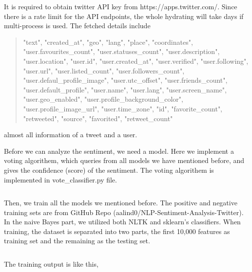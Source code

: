 \documentclass[12pt,a4paper]{article}
\begin{document}
    \inputminted[mathescape, linenos, numbersep=5pt, frame=lines, framesep=2mm, breaklines]{python}{../tweets_fetch.py}

    It is required to obtain twitter API key from https://apps.twitter.com/. Since there is a rate limit for the API endpoints, the whole hydrating will take days if multi-process is used. The fetched details include

    \begin{quotation}
      "text", "created\_at", "geo", "lang", "place", "coordinates", "user.favourites\_count", "user.statuses\_count", "user.description", "user.location", "user.id", "user.created\_at", "user.verified", "user.following", "user.url", "user.listed\_count", "user.followers\_count", "user.defaul_profile\_image", "user.utc\_offset", "user.friends\_count", "user.default\_profile", "user.name", "user.lang", "user.screen\_name", "user.geo\_enabled", "user.profile_background_color", "user.profile\_image\_url", "user.time\_zone", "id", "favorite\_count", "retweeted", "source", "favorited", "retweet\_count"
    \end{quotation}
 
    almost all information of a tweet and a user.

    Before we can analyze the sentiment, we need a model. Here we implement a voting algorithem, which queries from all models we have mentioned before, and gives the confidence (score) of the sentiment. The voting algorithem is implemented in vote_classifier.py file.

    \inputminted[mathescape, linenos, numbersep=5pt, frame=lines, framesep=2mm, breaklines]{python}{../vote_classifier.py}

    Then, we train all the models we mentioned before. The positive and negative training sets are from GitHub Repo (aalind0/NLP-Sentiment-Analysis-Twitter). In the naive Bayes part, we utilized both NLTK and sklearn's classifiers. When training, the dataset is separated into two parts, the first 10,000 features as training set and the remaining as the testing set.

    \inputminted[mathescape, linenos, numbersep=5pt, frame=lines, framesep=2mm, breaklines]{python}{../train_classifiers.py}

    The training output is like this,
\end{document}
